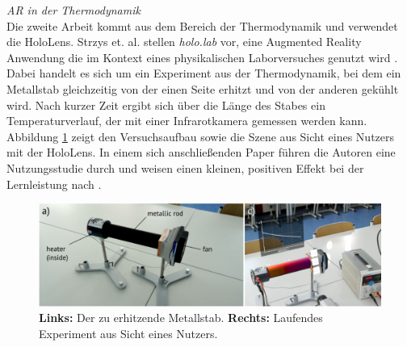 \textit{AR in der Thermodynamik}\\
Die zweite Arbeit kommt aus dem Bereich der Thermodynamik und verwendet die HoloLens. Strzys et. al. stellen \textit{holo.lab} vor, eine Augmented Reality Anwendung die im Kontext eines physikalischen Laborversuches genutzt wird \cite{Strzys17}. Dabei handelt es sich um ein Experiment aus der Thermodynamik, bei dem ein Metallstab gleichzeitig von der einen Seite erhitzt und von der anderen gekühlt wird. Nach kurzer Zeit ergibt sich über die Länge des Stabes ein Temperaturverlauf, der mit einer Infrarotkamera gemessen werden kann. Abbildung \ref{img:Strzys17} zeigt den Versuchsaufbau sowie die Szene aus Sicht eines Nutzers mit der HoloLens. In einem sich anschließenden Paper führen die Autoren eine Nutzungsstudie durch und weisen einen kleinen, positiven Effekt bei der Lernleistung nach \cite{Strzys18}.\\

\begin{figure}[h!]
	\centering
	\includegraphics[width=1\textwidth]{images/papers/Strzys18.png}
	\caption{\textbf{Links:} Der zu erhitzende Metallstab.\textbf{ Rechts:} Laufendes Experiment aus Sicht eines Nutzers. \cite{Strzys17}}
	\label{img:Strzys17}
\end{figure}

